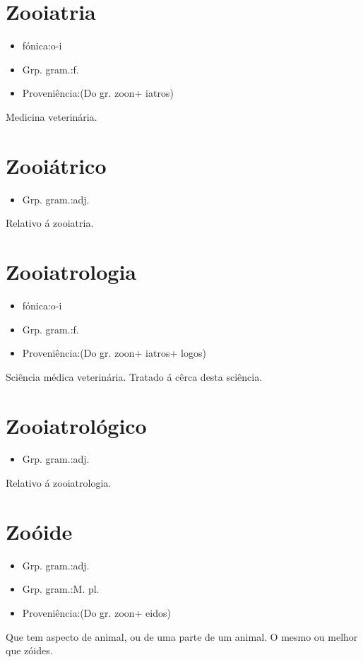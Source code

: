 \section{Zooiatria}
\begin{itemize}
\item {fónica:o-i}
\end{itemize}
\begin{itemize}
\item {Grp. gram.:f.}
\end{itemize}
\begin{itemize}
\item {Proveniência:(Do gr. \textunderscore zoon\textunderscore  + \textunderscore iatros\textunderscore )}
\end{itemize}
Medicina veterinária.
\section{Zooiátrico}
\begin{itemize}
\item {Grp. gram.:adj.}
\end{itemize}
Relativo á zooiatria.
\section{Zooiatrologia}
\begin{itemize}
\item {fónica:o-i}
\end{itemize}
\begin{itemize}
\item {Grp. gram.:f.}
\end{itemize}
\begin{itemize}
\item {Proveniência:(Do gr. \textunderscore zoon\textunderscore  + \textunderscore iatros\textunderscore  + \textunderscore logos\textunderscore )}
\end{itemize}
Sciência médica veterinária.
Tratado á cêrca desta sciência.
\section{Zooiatrológico}
\begin{itemize}
\item {Grp. gram.:adj.}
\end{itemize}
Relativo á zooiatrologia.
\section{Zoóide}
\begin{itemize}
\item {Grp. gram.:adj.}
\end{itemize}
\begin{itemize}
\item {Grp. gram.:M. pl.}
\end{itemize}
\begin{itemize}
\item {Proveniência:(Do gr. \textunderscore zoon\textunderscore  + \textunderscore eidos\textunderscore )}
\end{itemize}
Que tem aspecto de animal, ou de uma parte de um animal.
O mesmo ou melhor que \textunderscore zóides\textunderscore .
